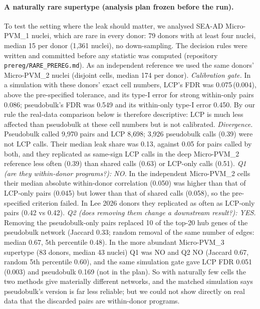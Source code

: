 \paragraph{A naturally rare supertype (analysis plan frozen before the run).} To test the setting where the leak should matter, we analysed SEA-AD Micro-PVM\_1 nuclei, which are rare in every donor: 79 donors with at least four nuclei, median 15 per donor (1{,}361 nuclei), no down-sampling. The decision rules were written and committed before any statistic was computed (repository \texttt{prereg/RARE\_PREREG.md}). As an independent reference we used the same donors' Micro-PVM\_2 nuclei (disjoint cells, median 174 per donor). \emph{Calibration gate.} In a simulation with these donors' exact cell numbers, LCP's FDR was 0.075\,(0.004), above the pre-specified tolerance, and its type-I error for strong within-only pairs 0.086; pseudobulk's FDR was 0.549 and its within-only type-I error 0.450. By our rule the real-data comparison below is therefore descriptive: LCP is much less affected than pseudobulk at these cell numbers but is not calibrated. \emph{Divergence.} Pseudobulk called 9{,}970 pairs and LCP 8{,}698; 3{,}926 pseudobulk calls (0.39) were not LCP calls. Their median leak share was 0.13, against 0.05 for pairs called by both, and they replicated as same-sign LCP calls in the deep Micro-PVM\_2 reference less often (0.39) than shared calls (0.63) or LCP-only calls (0.51). \emph{Q1 (are they within-donor programs?): NO.} In the independent Micro-PVM\_2 cells their median absolute within-donor correlation (0.050) was higher than that of LCP-only pairs (0.045) but lower than that of shared calls (0.058), so the pre-specified criterion failed. In Lee 2026 donors they replicated as often as LCP-only pairs (0.42 vs 0.42). \emph{Q2 (does removing them change a downstream result?): YES.} Removing the pseudobulk-only pairs replaced 10 of the top-20 hub genes of the pseudobulk network (Jaccard 0.33; random removal of the same number of edges: median 0.67, 5th percentile 0.48). In the more abundant Micro-PVM\_3 supertype (83 donors, median 43 nuclei) Q1 was NO and Q2 NO (Jaccard 0.67, random 5th percentile 0.60), and the same simulation gate gave LCP FDR 0.051 (0.003) and pseudobulk 0.169 (not in the plan). So with naturally few cells the two methods give materially different networks, and the matched simulation says pseudobulk's version is far less reliable; but we could not show directly on real data that the discarded pairs are within-donor programs.
